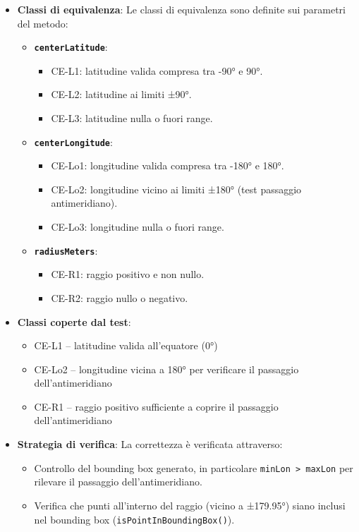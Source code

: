 \documentclass{book}
\begin{document}
\begin{itemize}

\item \textbf{Classi di equivalenza}:  
Le classi di equivalenza sono definite sui parametri del metodo:

\begin{itemize}
    \item \textbf{\texttt{centerLatitude}}:
    \begin{itemize}
        \item CE-L1: latitudine valida compresa tra -90° e 90°.
        \item CE-L2: latitudine ai limiti ±90°.
        \item CE-L3: latitudine nulla o fuori range.
    \end{itemize}

    \item \textbf{\texttt{centerLongitude}}:
    \begin{itemize}
        \item CE-Lo1: longitudine valida compresa tra -180° e 180°.
        \item CE-Lo2: longitudine vicino ai limiti ±180° (test passaggio antimeridiano).
        \item CE-Lo3: longitudine nulla o fuori range.
    \end{itemize}

    \item \textbf{\texttt{radiusMeters}}:
    \begin{itemize}
        \item CE-R1: raggio positivo e non nullo.
        \item CE-R2: raggio nullo o negativo.
    \end{itemize}
\end{itemize}

\item \textbf{Classi coperte dal test}:
\begin{itemize}
    \item CE-L1 – latitudine valida all’equatore (0°)
    \item CE-Lo2 – longitudine vicina a 180° per verificare il passaggio dell’antimeridiano
    \item CE-R1 – raggio positivo sufficiente a coprire il passaggio dell’antimeridiano
\end{itemize}

\item \textbf{Strategia di verifica}:  
La correttezza è verificata attraverso:
\begin{itemize}
    \item Controllo del bounding box generato, in particolare \texttt{minLon > maxLon} per rilevare il passaggio dell’antimeridiano.
    \item Verifica che punti all’interno del raggio (vicino a ±179.95°) siano inclusi nel bounding box (\texttt{isPointInBoundingBox()}).
\end{itemize}

\end{itemize}
\clearpage
\end{document}
